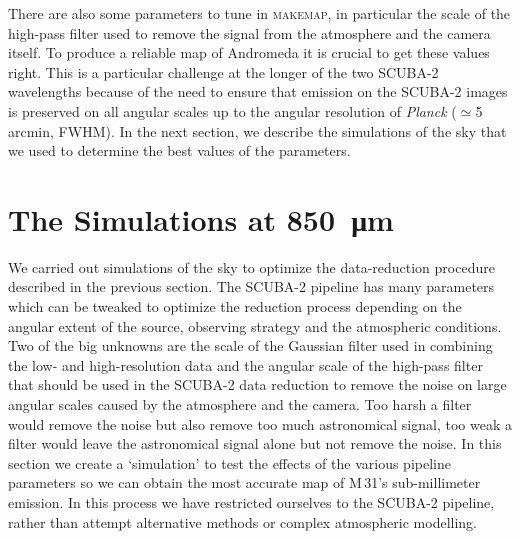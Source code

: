 \documentclass[a4paper,fleqn,usenatbib, twocolumn]{aastex63}
\begin{document}
There are also some parameters to tune in \textsc{makemap}, in particular
the scale of the high-pass filter used to remove the signal from the atmosphere
and the camera itself. To produce a reliable map of Andromeda it is crucial to
get these values right. This is a particular challenge at the
longer of the two SCUBA-2 wavelengths because of the need to ensure that emission on the SCUBA-2 images
is preserved on all angular scales up to the angular resolution of {\it Planck} ($\simeq$5 arcmin, FWHM). In the next section, we describe the simulations of the sky that we used to determine the best values of the parameters. 


\section{The Simulations at \SI{850}{\micro\meter}}
\label{sec:simulations}

We carried out simulations of the sky to optimize the data-reduction procedure
described in the previous section. The SCUBA-2 pipeline has many parameters which can 
be tweaked to optimize the reduction process depending on the angular extent of the source, observing
strategy and the atmospheric conditions. Two of the big unknowns are the scale of the
Gaussian filter used in combining the low- and high-resolution data and the
angular scale of the high-pass filter that should be used in the SCUBA-2 data reduction to remove
the noise on large angular scales caused by the atmosphere and the camera. Too harsh a filter would remove the
noise but also remove too much astronomical signal, too weak a filter would leave the
astronomical signal alone but not remove the noise. In this section we create a `simulation' to test the effects of
the various pipeline parameters so we can obtain the most accurate map of M\,31's sub-millimeter emission. In this process
we have restricted ourselves to the SCUBA-2 pipeline, rather than attempt alternative methods 
\citep[e.g., \textsc{Scanamorphos},][]{Roussel2013} or complex atmospheric modelling.
\end{document}
